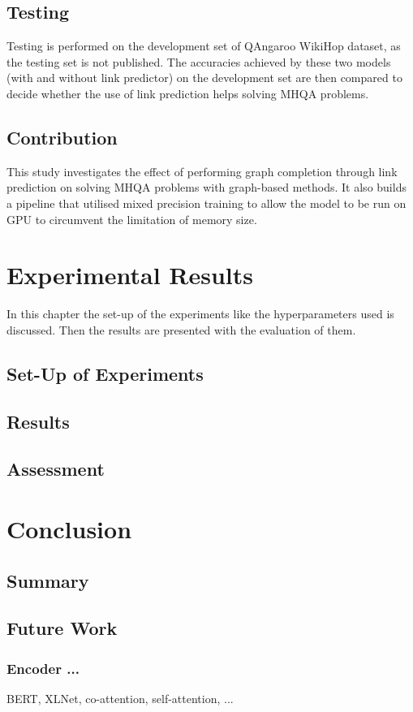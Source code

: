 \documentclass[12pt]{report}
\begin{document}
\section{Testing}
Testing is performed on the development set of QAngaroo WikiHop dataset, as the testing set is not published. The accuracies achieved by these two models (with and without link predictor) on the development set are then compared to decide whether the use of link prediction helps solving MHQA problems.

\section{Contribution}
This study investigates the effect of performing graph completion through link prediction on solving MHQA problems with graph-based methods. It also builds a pipeline that utilised mixed precision training to allow the model to be run on GPU to circumvent the limitation of memory size.


\chapter{Experimental Results}
In this chapter the set-up of the experiments like the hyperparameters used is discussed. Then the results are presented with the evaluation of them.

\section{Set-Up of Experiments}
\section{Results}
\section{Assessment}

\chapter{Conclusion}
\section{Summary}

\section{Future Work}
\subsection{Encoder ...}
BERT, XLNet, co-attention, self-attention, ...
\end{document}
